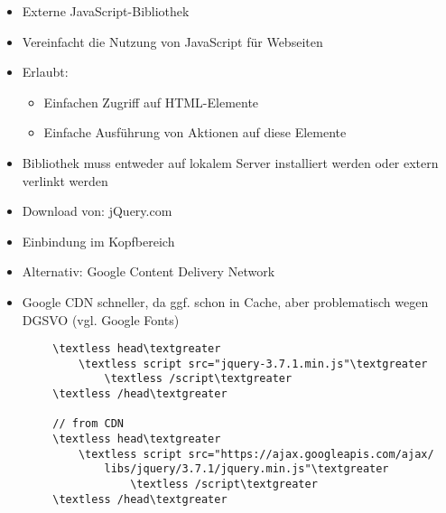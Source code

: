 \documentclass[10pt]{article}
\begin{document}
 

\noindent

    \begin{tcolorbox}[
    colback=Red!5!white,
    colframe=Red!75!black,
    title={\centering Allgemeines}]
    \begin{itemize}
        \item Externe JavaScript-Bibliothek
        \item Vereinfacht die Nutzung von JavaScript für Webseiten
        \item Erlaubt:
        \begin{itemize}
            \item Einfachen Zugriff auf HTML-Elemente
            \item Einfache Ausführung von Aktionen auf diese Elemente
        \end{itemize}
        \item Bibliothek muss entweder auf lokalem Server installiert werden oder extern verlinkt werden
        \item Download von: jQuery.com
        \item Einbindung im Kopfbereich
        \item Alternativ: Google Content Delivery Network
        \item Google CDN schneller, da ggf. schon in Cache, aber problematisch wegen DGSVO (vgl. Google Fonts)
    \end{itemize}
    \begin{lstlisting}
        \textless head\textgreater 
            \textless script src="jquery-3.7.1.min.js"\textgreater 
                \textless /script\textgreater 
        \textless /head\textgreater 

        // from CDN
        \textless head\textgreater 
            \textless script src="https://ajax.googleapis.com/ajax/
                libs/jquery/3.7.1/jquery.min.js"\textgreater 
                    \textless /script\textgreater 
        \textless /head\textgreater 
    \end{lstlisting}
    \end{tcolorbox}
\end{document}
